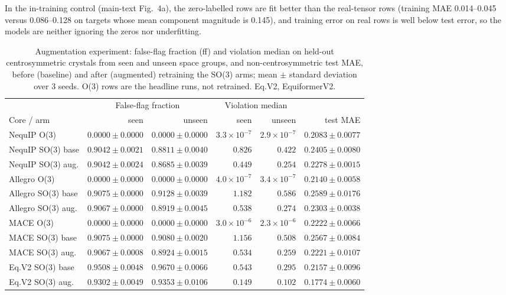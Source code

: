 In the in-training control (main-text Fig.~4a), the zero-labelled rows are fit better than the real-tensor rows (training MAE 0.014--0.045 versus 0.086--0.128 on targets whose mean component magnitude is 0.145), and training error on real rows is well below test error, so the models are neither ignoring the zeros nor underfitting.

\begin{table}[htbp]
\centering
\caption{Augmentation experiment: false-flag fraction (ff) and violation median on held-out centrosymmetric crystals from seen and unseen space groups, and non-centrosymmetric test MAE, before (baseline) and after (augmented) retraining the SO(3) arms; mean $\pm$ standard deviation over 3 seeds. O(3) rows are the headline runs, not retrained. Eq.V2, EquiformerV2.}
\label{stab:e1}
\setlength{\tabcolsep}{2pt}
\fontsize{7bp}{8.5bp}\selectfont
\begin{tabular}{@{}l rr rr r@{}}
\toprule
 & \multicolumn{2}{c}{False-flag fraction} & \multicolumn{2}{c}{Violation median} & \\
\cmidrule(lr){2-3}\cmidrule(lr){4-5}
Core / arm & seen & unseen & seen & unseen & test MAE \\
\midrule
NequIP O(3) & $0.0000 \pm 0.0000$ & $0.0000 \pm 0.0000$ & $3.3\times10^{-7}$ & $2.9\times10^{-7}$ & $0.2083 \pm 0.0077$ \\
NequIP SO(3) base & $0.9042 \pm 0.0021$ & $0.8811 \pm 0.0040$ & $0.826$ & $0.422$ & $0.2405 \pm 0.0080$ \\
NequIP SO(3) aug. & $0.9042 \pm 0.0024$ & $0.8685 \pm 0.0039$ & $0.449$ & $0.254$ & $0.2278 \pm 0.0015$ \\
Allegro O(3) & $0.0000 \pm 0.0000$ & $0.0000 \pm 0.0000$ & $4.0\times10^{-7}$ & $3.4\times10^{-7}$ & $0.2140 \pm 0.0058$ \\
Allegro SO(3) base & $0.9075 \pm 0.0000$ & $0.9128 \pm 0.0039$ & $1.182$ & $0.586$ & $0.2589 \pm 0.0176$ \\
Allegro SO(3) aug. & $0.9067 \pm 0.0000$ & $0.8919 \pm 0.0045$ & $0.538$ & $0.274$ & $0.2303 \pm 0.0038$ \\
MACE O(3) & $0.0000 \pm 0.0000$ & $0.0000 \pm 0.0000$ & $3.0\times10^{-6}$ & $2.3\times10^{-6}$ & $0.2222 \pm 0.0066$ \\
MACE SO(3) base & $0.9075 \pm 0.0000$ & $0.9080 \pm 0.0020$ & $1.156$ & $0.508$ & $0.2567 \pm 0.0084$ \\
MACE SO(3) aug. & $0.9067 \pm 0.0008$ & $0.8924 \pm 0.0015$ & $0.534$ & $0.259$ & $0.2221 \pm 0.0107$ \\
Eq.V2 SO(3) base & $0.9508 \pm 0.0048$ & $0.9670 \pm 0.0066$ & $0.543$ & $0.295$ & $0.2157 \pm 0.0096$ \\
Eq.V2 SO(3) aug. & $0.9302 \pm 0.0049$ & $0.9353 \pm 0.0106$ & $0.149$ & $0.102$ & $0.1774 \pm 0.0060$ \\
\bottomrule
\end{tabular}

\end{table}

